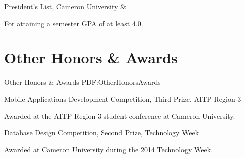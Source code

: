 \documentclass[letterpaper,10pt,oneside]{article}
\begin{document}
\begin{body}
\EntryGap

President's List, Cameron University
\hfill
{} \& 
\begin{detail}
	For attaining a semester GPA of at least 4.0.
\end{detail}



\section
{Other Honors\newline
\& Awards}
{Other Honors \& Awards}
{PDF:OtherHonorsAwards}

Mobile Applications Development Competition,
Third Prize,
AITP Region 3
\hfill
{}
\begin{detail}
Awarded at the AITP Region 3 student conference at Cameron University.
\end{detail}

\EntryGap

Database Design Competition,
Second Prize,
Technology Week
\hfill
{}
\begin{detail}
	Awarded at Cameron University during the 2014 Technology Week.
\end{detail}










\end{body}
\end{document}
